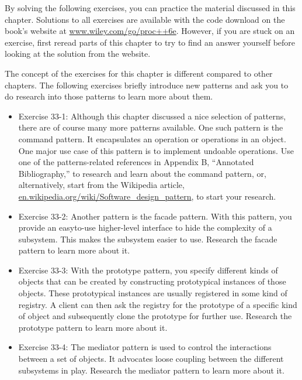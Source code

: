 By solving the following exercises, you can practice the material discussed in this chapter. Solutions to all exercises are available with the code download on the book’s website at \url{www.wiley.com/go/proc++6e}. However, if you are stuck on an exercise, first reread parts of this chapter to try to find an answer yourself before looking at the solution from the website.

The concept of the exercises for this chapter is different compared to other chapters. The following exercises briefly introduce new patterns and ask you to do research into those patterns to learn more about them.

\begin{itemize}
\item
Exercise 33-1: Although this chapter discussed a nice selection of patterns, there are of course many more patterns available. One such pattern is the command pattern. It encapsulates an operation or operations in an object. One major use case of this pattern is to implement undoable operations. Use one of the patterns-related references in Appendix B, “Annotated Bibliography,” to research and learn about the command pattern, or, alternatively, start from the Wikipedia article, \url{en.wikipedia.org/wiki/Software_design_pattern}, to start your research.

\item
Exercise 33-2: Another pattern is the facade pattern. With this pattern, you provide an easyto-use higher-level interface to hide the complexity of a subsystem. This makes the subsystem easier to use. Research the facade pattern to learn more about it.

\item
Exercise 33-3: With the prototype pattern, you specify different kinds of objects that can be created by constructing prototypical instances of those objects. These prototypical instances are usually registered in some kind of registry. A client can then ask the registry for the prototype of a specific kind of object and subsequently clone the prototype for further use. Research the prototype pattern to learn more about it.

\item
Exercise 33-4: The mediator pattern is used to control the interactions between a set of objects. It advocates loose coupling between the different subsystems in play. Research the mediator pattern to learn more about it.
\end{itemize}












